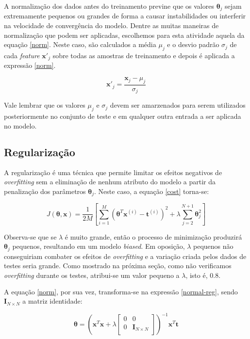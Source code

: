 \documentclass[10pt,twocolumn,letterpaper]{article}
\begin{document}
A normalização dos dados antes do treinamento previne que os valores \(\bm{\theta}_j\) sejam extremamente pequenos ou grandes de forma a
causar instabilidades ou interferir na velocidade de convergência do modelo. Dentre as muitas maneiras de normalização que podem ser aplicadas, escolhemos para esta atividade aquela da equação \ref{norm}. Neste caso, são calculados a média \(\mu_j\) e o desvio padrão \(\sigma_j\) de cada \textit{feature} \(\bm {x'}_j\) sobre todas as amostras de treinamento e depois é aplicada a expressão \ref{norm}.

\begin {equation}
\label {norm}
\bm {x'}_j = \frac {\bm{x}_j - \mu_j}{\sigma_j}
\end{equation}

Vale lembrar que os valores \(\mu_j\) e \(\sigma_j\) devem ser amarzenados para serem utilizados posteriormente no conjunto de teste e em qualquer outra entrada a ser aplicada no modelo.

\subsection{Regularização}

A regularização é uma técnica que permite limitar os efeitos negativos de \textit{overfitting} sem a eliminação de nenhum atributo do modelo a partir da penalização dos parâmetros \(\bm{\theta}_j\). Neste caso, a equação \ref{cost} torna-se:

\begin{equation}
\label {cost-reg}
J(\bm{\theta}, \bm{x}) = \frac{1}{2M} \left[\displaystyle\sum_{i=1}^{M} \left(\bm{\theta}^T\bm{x}^{(i)} - \bm{t}^{(i)}\right)^2 + \lambda \displaystyle\sum_{j=2}^{N + 1} \bm{\theta}_j^2 \right]
\end{equation}

Observa-se que se \(\lambda\) é muito grande, então o processo de minimização produzirá \(\bm{\theta}_j\) pequenos, resultando em um modelo \textit{biased}. Em oposição, \(\lambda\) pequenos não conseguiriam combater os efeitos de \textit{overfitting} e a variação criada pelos dados de testes seria grande. Como mostrado na próxima seção, como não verificamos \textit{overfitting} durante os testes, atribui-se um valor pequeno a \(\lambda\), isto é, 0.8.

A equação \ref{norm}, por sua vez, transforma-se na expressão \ref{normal-reg}, sendo \(\bm{I}_{N \times N}\) a matriz identidade:

\begin{equation}
\label {normal-reg}
\bm{\theta} = \left(\bm{x}^T\bm{x} + \lambda
\begin{bmatrix}
    0       & 0 \\
    0       & \bm{I}_{N \times N} \\
\end{bmatrix}
\right)^{-1} \bm{x}^T \bm{t}
\end{equation}
\end{document}
